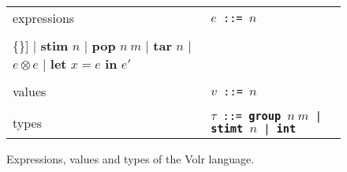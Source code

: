 \begin{figure}
  \begin{tabular}[t]{l l}
    expressions 
    & \texttt{$e$ ::= $n$} \\
    & \begin{minipage}{0.6\textwidth}
      \begin{Verbatim}[mathescape,commandchars=\\\{\}]
    | \textbf{stim} $n$
    | \textbf{pop} $n\ m$
    | \textbf{tar} $n$
    | $e \otimes e$
    | \textbf{let} $x = e$ \textbf{in} $e'$
      \end{Verbatim} 
    \end{minipage} \\
    & \\ %
    values
    & \texttt{$v$ ::= $n$} \\
    & \\ %

    types
    & \texttt{$\tau$ ::= \textbf{group} $n\ m$ | \textbf{stimt} $n$ | \textbf{int} }
  \end{tabular}

  \caption{Expressions, values and types of the Volr language.}
  \label{fig:volr-expr}
\end{figure}
